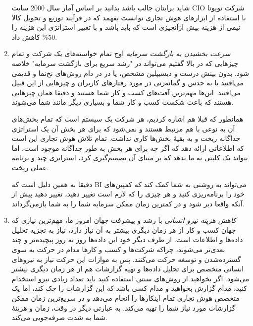 \documentclass{llncs}
\begin{document}
\begin{enumerate}
شاید برایتان جالب باشد بدانید بر اساس آمار سال 2000 سایت CIO شرکت تویوتا با استفاده از ابزارهای هوش تجاری توانست بفهمد که در فرآیند توزیع و تحویل کالا نیمی از هزینه بیش ازآنچیزی است که باید باشد و با تغییر استراتژی این هزینه را 50\% کاهش داد.

  \item \textit{سرعت بخشیدن به بازگشت سرمایه}
    \newline
اوج تمام خواسته‌های یک شرکت و تمام چیزهایی که در بالا گفتیم می‌تواند در "رشد سریع برای بازگشت سرمایه" خلاصه شود. بدون بینش درست و دیسیپلین مشخص، یا در در دام روش‌های نخ‌نما و قدیمی می‌افتید یا به حدس و گمانه‌زنی در مورد رفتارهای کاربران و چیزهایی از این قبیل می‌افتید. این‌ها مهم‌ترین آفت‌های کسب و کار شما هستند و دقیقا همان چیزهایی هستند که باعث شکست کسب و کار شما و بسیاری دیگر مانند شما می‌شوند.

همانطور که قبلا هم اشاره کردیم، هر شرکت یک سیستم است که تمام بخش‌های آن به نوعی با هم مرتبط هستند و نمی‌شود که برای هر بخش آن یک استراتژی جداگانه ریخت و به بقیۀ بخش‌ها کاری نداشت. تمام تلاش هوش تجاری این است که اطلاعاتی ارائه دهد که اگر چه برای هر بخش به طور جداگانه موجود است، اما بتواند یک کلیتی به ما بدهد که بر مبنای آن تصمیم‌گیری کرد، استراتزی چید و برنامه عملی ریخت.

دقیقا به همین دلیل است که BI می‌تواند به روشنی به شما کمک کند که کمپین‌های خود را برنامه‌ریزی کنید و هر چیزی را که لازم است تغییر دهید، تغییر دهید پیش از آنکه واقعا دیر شود و در کمترین زمان ممکن سرمایه شما را به شما بازمی‌گرداند.

  \item \textit{کاهش هزینه نیرو انسانی}
  \newline
با رشد و پیشرفت جهان امروز ما، مهم‌ترین نیازی که جهان کسب و کار از هر زمان دیگری بیشتر به آن نیاز دارد، نیاز به تجزیه تحلیل داده‌ها و اطلاعات است. از طرف دیگر خود این داده‌ها روز به روز پیچیده‌تر و چند بعدی‌تر می‌شوند، چراکه شرکت‌ها و کسب و کارها مدام در حرکت به سوی گسترده‌شدن و توسغه حرکت می‌کنند. پس به موازات این حرکت نیاز به نیروهای انسانی متخصص برای تحلیل داده‌ها و تهیه گزارشات هم از هر زمان دیگری بیشتر می‌شود. اگر بخواهید از روش‌های سنتی استفاده کنید باید تعداد زیادی نیرو استخدام کنید، مدام گزارش بخواهید و مدام کسی باشد که این گزارشات را چک کند، اما یک متخصص هوش تجاری تمام اینکارها را انجام می‌دهد و در سریع‌ترین زمان ممکن گزارشات مورد نیاز شما را تهیه می‌کند. به عبارتی دیگر در وقت، زمان و هزینۀ شما به شدت صرفه‌جویی می‌کند.

\end{enumerate}
\end{document}
